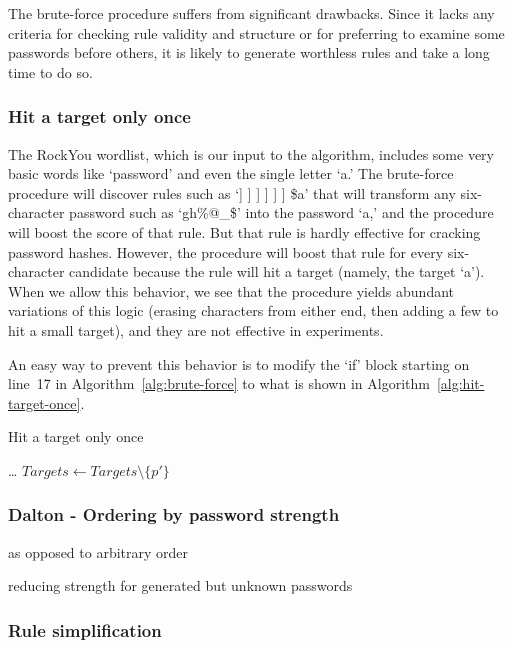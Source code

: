 \documentclass[letterpaper,twocolumn,10pt]{article}
\begin{document}
The brute-force procedure suffers from significant drawbacks. Since it lacks
any criteria for checking rule validity and structure or for preferring to
examine some passwords before others, it is likely to generate worthless rules
and take a long time to do so.

\subsubsection{Hit a target only once}

The RockYou wordlist, which is our input to the algorithm, includes some very
basic words like `password' and even the single letter `a.' The brute-force
procedure will discover rules such as `] ] ] ] ] ] \$a' that will transform any
six-character password such as `gh\%@\_\$' into the password `a,' and the
procedure will boost the score of that rule. But that rule is hardly effective
for cracking password hashes. However, the procedure will boost that rule for
every six-character candidate because the rule will hit a target (namely, the
target `a'). When we allow this behavior, we see that the procedure yields
abundant variations of this logic (erasing characters from either end, then
adding a few to hit a small target), and they are not effective in experiments.

An easy way to prevent this behavior is to modify the `if' block starting on
line~17 in Algorithm~\ref{alg:brute-force} to what is shown in
Algorithm~\ref{alg:hit-target-once}.

\begin{algorithm}\caption{Hit a target only once}
\begin{algorithmic}
        \State \dots
      \EndFor
      \State $Targets \gets Targets \setminus \{p'\}$
    \EndIf
\end{algorithmic}
\label{alg:hit-target-once}
\end{algorithm}

\subsubsection{Dalton - Ordering by password strength}

as opposed to arbitrary order

\cite{bonneau2012statistical}

reducing strength for generated but unknown passwords


\subsubsection{Rule simplification}
\end{document}
